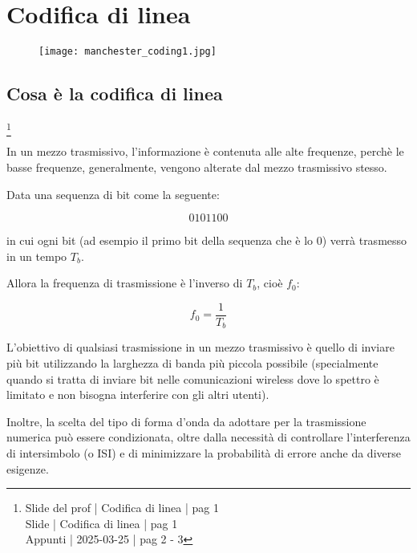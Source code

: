 \chapter{Codifica di linea}

\begin{figure}[h]
    \centering
    \texttt{[image: manchester\_coding1.jpg]}
\end{figure}

\newpage 

\section{Cosa è la codifica di linea}
\footnote{Slide del prof | Codifica di linea | pag 1 \\  
Slide | Codifica di linea | pag  1\\
Appunti | 2025-03-25 | pag 2 - 3
}

In un mezzo trasmissivo, l'informazione è contenuta alle alte frequenze, 
perchè le basse frequenze, generalmente, vengono alterate dal mezzo trasmissivo stesso. \newline 

Data una sequenza di bit come la seguente: 

{
    \Large 
    \begin{equation}
        0101100
    \end{equation}
}

in cui ogni bit (ad esempio il primo bit della sequenza che è lo 0) 
verrà trasmesso in un tempo $T_b$. \newline 

Allora la frequenza di trasmissione è l'inverso di $T_b$, cioè $f_0$: 

{
    \Large 
    \begin{equation}
        f_0 = \frac{1}{T_b}
    \end{equation}
}

L'obiettivo di qualsiasi trasmissione in un mezzo trasmissivo è quello di inviare più bit utilizzando la larghezza di banda più piccola possibile 
(specialmente quando si tratta di inviare bit nelle comunicazioni wireless dove lo spettro è limitato e non bisogna interferire con gli altri utenti). \newline 

Inoltre, la scelta del tipo di forma d'onda da adottare per la trasmissione numerica può essere condizionata, 
oltre dalla necessità di controllare l'interferenza di intersimbolo (o ISI) e di minimizzare la probabilità di errore anche da diverse esigenze. \newline 

